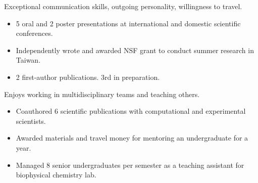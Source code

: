 

\begin{cventries}
\vspace{-4.0mm}

  \cventry
    {} %
    {} %
    {} %
    {} %
    {
      \begin{cvitems} %
        \item {Exceptional communication skills, outgoing personality, willingness to travel.}
        \begin{itemize}
       	 \item 5 oral and 2 poster presentations at international and domestic scientific conferences.
       	 \item Independently wrote and awarded NSF grant to conduct summer research in Taiwan.
       	 \item 2 first-author publications. 3rd in preparation.
        \end{itemize}
        \vspace{1.0mm}
        \item {Enjoys working in multidisciplinary teams and teaching others.}
        \begin{itemize}
         \item Coauthored 6 scientific publications with computational and experimental scientists.
         \item Awarded materials and travel money for mentoring an undergraduate for a year.
         \item Managed 8 senior undergraduates per semester as a teaching assistant for biophysical chemistry lab.
        \end{itemize}
      \end{cvitems}
    }
\vspace{-4.0mm}
\end{cventries}
